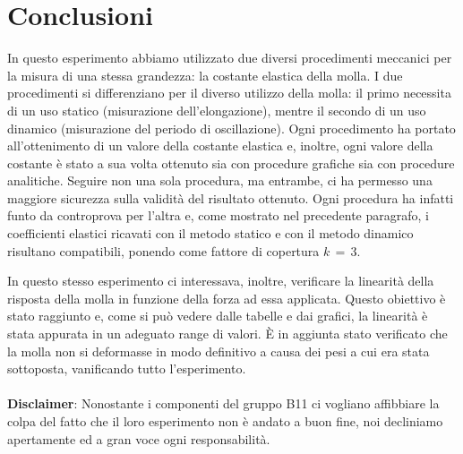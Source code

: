 \section{Conclusioni}
In questo esperimento abbiamo utilizzato due diversi procedimenti meccanici per la misura di una stessa grandezza: la costante elastica della molla. I due procedimenti si differenziano per il diverso utilizzo della molla: il primo necessita di un uso statico (misurazione dell'elongazione), mentre il secondo di un uso dinamico (misurazione del periodo di oscillazione). Ogni procedimento ha portato all'ottenimento di un valore della costante elastica e, inoltre, ogni valore della costante è stato a sua volta ottenuto sia con procedure grafiche sia con procedure analitiche.
Seguire non una sola procedura, ma entrambe, ci ha permesso una maggiore sicurezza sulla validità del risultato ottenuto. Ogni procedura ha infatti funto da controprova per l'altra e, come mostrato nel precedente paragrafo, i coefficienti elastici ricavati con il metodo statico e con il metodo dinamico risultano compatibili, ponendo come fattore di copertura $k\,=\,3$.

In questo stesso esperimento ci interessava, inoltre, verificare la linearità della risposta della molla in funzione della forza ad essa applicata. Questo obiettivo è stato raggiunto e, come si può vedere dalle tabelle e dai grafici, la linearità è stata appurata in un adeguato range di valori.
È in aggiunta stato verificato che la molla non si deformasse in modo definitivo a causa dei pesi a cui era stata sottoposta, vanificando tutto l'esperimento.
\\
\\


\textbf{Disclaimer}: Nonostante i componenti del gruppo B11 ci vogliano affibbiare la colpa del fatto che il loro esperimento non è andato a buon fine, noi decliniamo apertamente ed a gran voce ogni responsabilità.
